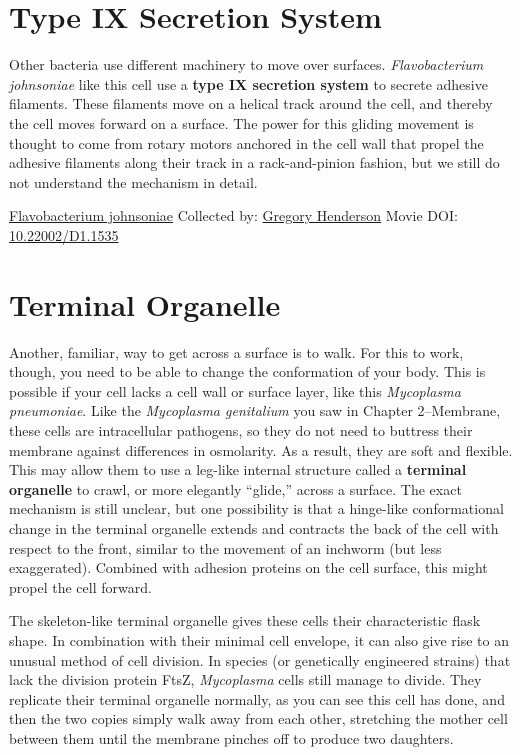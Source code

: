 \documentclass[]{tufte-book}
\begin{document}
\hypertarget{type-ix-secretion-system}{%
\section{Type IX Secretion System}\label{type-ix-secretion-system}}

Other bacteria use different machinery to move over surfaces. \emph{Flavobacterium johnsoniae} like this cell use a \textbf{type IX secretion system} to secrete adhesive filaments. These filaments move on a helical track around the cell, and thereby the cell moves forward on a surface. The power for this gliding movement is thought to come from rotary motors anchored in the cell wall that propel the adhesive filaments along their track in a rack-and-pinion fashion, but we still do not understand the mechanism in detail.



\hypertarget{htmlwidget-dc1d913c449453b5b695}{}

\label{fig:6-11}\protect\hyperlink{tree}{Flavobacterium johnsoniae} Collected by: \protect\hyperlink{gregory_henderson}{Gregory Henderson} Movie DOI: \href{https://doi.org/10.22002/D1.1535}{10.22002/D1.1535}

\hypertarget{terminal-organelle}{%
\section{Terminal Organelle}\label{terminal-organelle}}

Another, familiar, way to get across a surface is to walk. For this to work, though, you need to be able to change the conformation of your body. This is possible if your cell lacks a cell wall or surface layer, like this \emph{Mycoplasma pneumoniae}. Like the \emph{Mycoplasma genitalium} you saw in Chapter 2--Membrane, these cells are intracellular pathogens, so they do not need to buttress their membrane against differences in osmolarity. As a result, they are soft and flexible. This may allow them to use a leg-like internal structure called a \textbf{terminal organelle} to crawl, or more elegantly ``glide,'' across a surface. The exact mechanism is still unclear, but one possibility is that a hinge-like conformational change in the terminal organelle extends and contracts the back of the cell with respect to the front, similar to the movement of an inchworm (but less exaggerated). Combined with adhesion proteins on the cell surface, this might propel the cell forward.

The skeleton-like terminal organelle gives these cells their characteristic flask shape. In combination with their minimal cell envelope, it can also give rise to an unusual method of cell division. In species (or genetically engineered strains) that lack the division protein FtsZ, \emph{Mycoplasma} cells still manage to divide. They replicate their terminal organelle normally, as you can see this cell has done, and then the two copies simply walk away from each other, stretching the mother cell between them until the membrane pinches off to produce two daughters.
\end{document}
